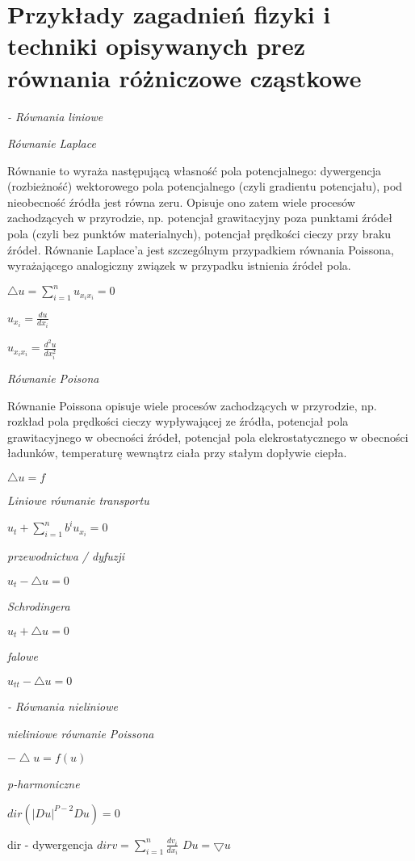 \section{Przykłady zagadnień fizyki i techniki opisywanych prez równania różniczowe cząstkowe}


\textit{- Równania liniowe}


\textit{Równanie Laplace}


Równanie to wyraża następującą własność pola potencjalnego: dywergencja (rozbieżność) wektorowego pola potencjalnego (czyli gradientu potencjału), pod nieobecność źródła jest równa zeru. Opisuje ono zatem wiele procesów zachodzących w przyrodzie, np. potencjał grawitacyjny poza punktami źródeł pola (czyli bez punktów materialnych), potencjał prędkości cieczy przy braku źródeł. Równanie Laplace’a jest szczególnym przypadkiem równania Poissona, wyrażającego analogiczny związek w przypadku istnienia źródeł pola.


$ \bigtriangleup u = \sum_{i=1}^{n} u_{x_ix_i} =0$

$ u_{x_i} = \frac{du}{dx_i}$

$ u_{x_i x_i} = \frac{d^2u}{dx_i^2}$

\textit{Równanie Poisona}



Równanie Poissona opisuje wiele procesów zachodzących w przyrodzie, np. rozkład pola prędkości cieczy wypływającej ze źródła, potencjał pola grawitacyjnego w obecności źródeł, potencjał pola elekrostatycznego w obecności ładunków, temperaturę wewnątrz ciała przy stałym dopływie ciepła.

$ \bigtriangleup u =f$

\textit{Liniowe równanie transportu}

$u_t + \sum_{i=1}^{n}b^iu_{x_i} = 0$

\textit{przewodnictwa / dyfuzji}

$u_t - \bigtriangleup u = 0$

\textit{Schrodingera}

$u_t + \bigtriangleup u = 0$

\textit{falowe}

$u_{tt} - \bigtriangleup u = 0 $

\textit{- Równania nieliniowe}

\textit{ nieliniowe równanie Poissona}

$-\bigtriangleup u = f(u)$

\textit{ p-harmoniczne }

$dir( |Du|^{P-2} Du ) = 0$

dir - dywergencja
$dir v = \sum_{i=1}^n \frac{dv_i}{dx_i}$
$Du = \bigtriangledown u$